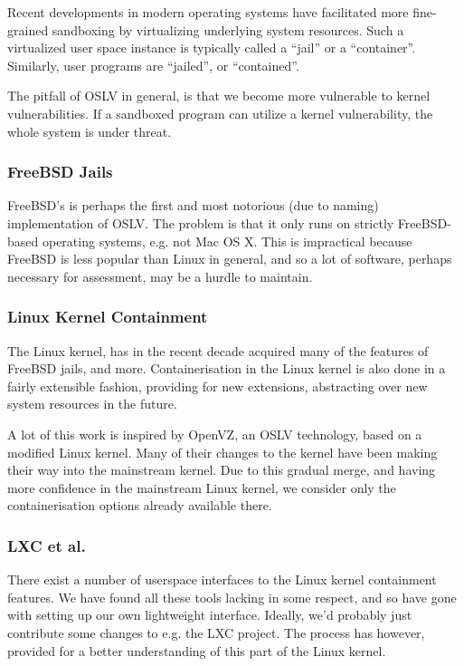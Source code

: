 Recent developments in modern operating systems have facilitated more
fine-grained sandboxing by virtualizing underlying system resources. Such a
virtualized user space instance is typically called a ``jail'' or a
``container''. Similarly, user programs are ``jailed'', or ``contained''.

The pitfall of OSLV in general, is that we become more vulnerable to kernel
vulnerabilities. If a sandboxed program can utilize a kernel vulnerability, the
whole system is under threat.

\subsubsection{FreeBSD Jails}

FreeBSD's \cite{man-8-jail} is perhaps the first and most notorious (due to
naming) implementation of OSLV. The problem is that it only runs on strictly
FreeBSD-based operating systems, e.g. not Mac OS X. This is impractical because
FreeBSD is less popular than Linux in general, and so a lot of software,
perhaps necessary for assessment, may be a hurdle to maintain.

\subsubsection{Linux Kernel Containment}

The Linux kernel, has in the recent decade acquired many of the features of
FreeBSD jails, and more. Containerisation in the Linux kernel is also done in a
fairly extensible fashion, providing for new extensions, abstracting over new
system resources in the future.

A lot of this work is inspired by OpenVZ, an OSLV technology, based on a
modified Linux kernel. Many of their changes to the kernel have been making
their way into the mainstream kernel\cite{kerrisk-2012}. Due to this gradual
merge, and having more confidence in the mainstream Linux kernel, we consider
only the containerisation options already available there.

\subsubsection{LXC et al.}

There exist a number of userspace interfaces to the Linux kernel containment
features. We have found all these tools lacking in some respect, and so have
gone with setting up our own lightweight interface. Ideally, we'd probably just
contribute some changes to e.g. the LXC project. The process has however,
provided for a better understanding of this part of the Linux kernel.

